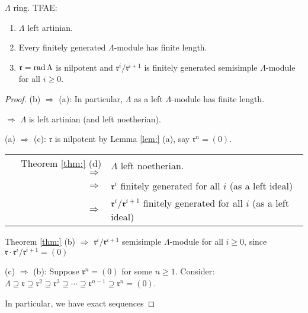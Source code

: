\begin{cor}
$\Lambda$ ring. TFAE:
\begin{enumerate}[\rm(a)]
\item $\Lambda$ left artinian.
\item Every finitely generated $\Lambda$-module has finite length.
\item $\mathfrak{r} = \operatorname{rad}\nolimits\Lambda$ is nilpotent and
  $\mathfrak{r}^i/\mathfrak{r}^{i + 1}$ is finitely generated
  semisimple $\Lambda$-module for all $i\geq 0$. 
\end{enumerate}
\end{cor}
\begin{proof}
(b) $\Rightarrow$ (a): In particular, $\Lambda$ as a left
$\Lambda$-module has finite length. 

$\Rightarrow$ $\Lambda$ is left artinian (and left noetherian). 

(a) $\Rightarrow$ (c):  $\mathfrak{r}$ is nilpotent by Lemma
\ref{lem:} (a), say $\mathfrak{r}^n = (0)$. 
\begin{center}
\begin{tabular}{rl}
Theorem \ref{thm:} (d) $\Rightarrow$ & $\Lambda$ left noetherian.\\
$\Rightarrow$ & $\mathfrak{r}^i$ finitely generated for all $i$ (as a
left ideal)\\
$\Rightarrow$ & $\mathfrak{r}^i/\mathfrak{r}^{i+1}$ finitely generated for all $i$ (as a
left ideal)\\
\end{tabular}
\end{center}
Theorem \ref{thm:} (b) $\Rightarrow$
$\mathfrak{r}^i/\mathfrak{r}^{i+1}$ semisimple $\Lambda$-module for
all $i\geq 0$, since $\mathfrak{r}\cdot \mathfrak{r}^i/\mathfrak{r}^{i+1}=(0)$

(c) $\Rightarrow$ (b):  Suppose $\mathfrak{r}^n = (0)$ for some $n\geq
1$.  Consider: $\Lambda \supseteq \mathfrak{r}\supseteq \mathfrak{r}^2
\supseteq \mathfrak{r}^3\supseteq \cdots \supseteq
\mathfrak{r}^{n-1}\supseteq \mathfrak{r}^n =(0)$.

\label{2017-pages}

In particular, we have exact sequences 


\end{proof}
